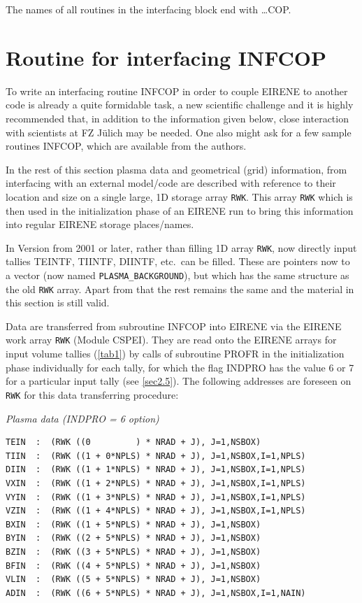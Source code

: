 The names of all routines in the interfacing block end with \dots COP.

\section{Routine for interfacing INFCOP} \label{sec4.1}

To write an interfacing routine INFCOP in order to couple EIRENE to another
code is already a quite formidable task, a new scientific challenge and it is
highly recommended that, in addition to the information given below, close
interaction with scientists at FZ J\"ulich may be needed.
One also might ask for a few sample routines INFCOP, which are available from
the authors.

In the rest of this section plasma data and geometrical (grid) information,
from interfacing with an external model/code are described with reference to
their location and size on a single large, 1D storage array
\lstinline|RWK|.
This array \lstinline|RWK| which is then used in the initialization
phase of an EIRENE run to bring this information into regular EIRENE storage
places/names.

In Version from 2001 or later, rather than filling 1D array
\lstinline|RWK|, now directly input tallies TEINTF, TIINTF, DIINTF,
etc.\ can be filled.
These are pointers now to a vector (now named \lstinline|PLASMA_BACKGROUND|), but
which has the same structure as the old \lstinline|RWK| array.
Apart from that the rest remains the same and the material in this section is
still valid.

Data are transferred from subroutine INFCOP into EIRENE via the EIRENE work
array \lstinline|RWK|  (Module CSPEI).
They are read onto the EIRENE arrays for input volume tallies (\cref{tab1}) by
calls of subroutine PROFR in the initialization phase individually for each
tally, for which the flag INDPRO has the value 6 or 7 for a particular input
tally (see \cref{sec2.5}).
The following addresses are foreseen on \lstinline|RWK| for this data
transferring procedure:

\textsl{Plasma data (INDPRO = 6 option)}

\begin{lstlisting}
TEIN  :  (RWK ((0         ) * NRAD + J), J=1,NSBOX)
TIIN  :  (RWK ((1 + 0*NPLS) * NRAD + J), J=1,NSBOX,I=1,NPLS)
DIIN  :  (RWK ((1 + 1*NPLS) * NRAD + J), J=1,NSBOX,I=1,NPLS)
VXIN  :  (RWK ((1 + 2*NPLS) * NRAD + J), J=1,NSBOX,I=1,NPLS)
VYIN  :  (RWK ((1 + 3*NPLS) * NRAD + J), J=1,NSBOX,I=1,NPLS)
VZIN  :  (RWK ((1 + 4*NPLS) * NRAD + J), J=1,NSBOX,I=1,NPLS)
BXIN  :  (RWK ((1 + 5*NPLS) * NRAD + J), J=1,NSBOX)
BYIN  :  (RWK ((2 + 5*NPLS) * NRAD + J), J=1,NSBOX)
BZIN  :  (RWK ((3 + 5*NPLS) * NRAD + J), J=1,NSBOX)
BFIN  :  (RWK ((4 + 5*NPLS) * NRAD + J), J=1,NSBOX)
VLIN  :  (RWK ((5 + 5*NPLS) * NRAD + J), J=1,NSBOX)
ADIN  :  (RWK ((6 + 5*NPLS) * NRAD + J), J=1,NSBOX,I=1,NAIN)
\end{lstlisting}

